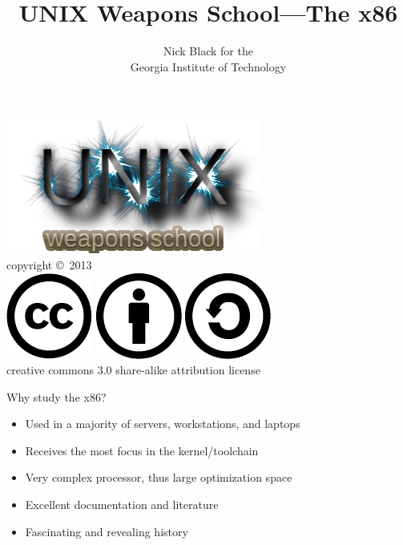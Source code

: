 \documentclass[xcolor={dvipsnames,table}]{beamer}
\title{UNIX Weapons School---The x86}
\date{}
\author{Nick Black for the\\
Georgia Institute of Technology
}
\begin{document}
\begin{frame}
\titlepage
\begin{center}
\includegraphics[scale=0.33]{images/uws.png}\\
\vspace{.1in}
\tiny{copyright \copyright\ 2013}\\
\includegraphics[scale=.25]{images/cc-logo.pdf}
\includegraphics[scale=.25]{images/cc-new.pdf}
\includegraphics[scale=.25]{images/cc-share.pdf}\\
\tiny{creative commons 3.0 share-alike attribution license}
\end{center}
\end{frame}

\begin{frame}{Why study the x86?}
\begin{itemize}
\item Used in a majority of servers, workstations, and laptops
\item Receives the most focus in the kernel/toolchain
\item Very complex processor, thus large optimization space
\item Excellent documentation and literature
\item Fascinating and revealing history
\end{itemize}
\end{frame}
\end{document}
